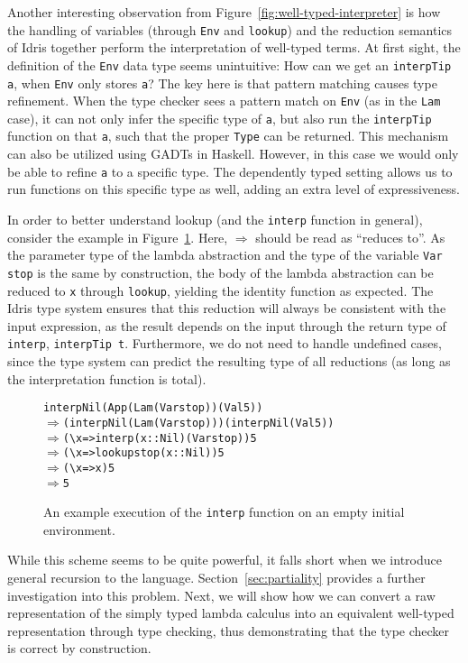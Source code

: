 Another interesting observation from Figure~\ref{fig:well-typed-interpreter} is how the handling of variables (through \texttt{Env} and \texttt{lookup}) and the reduction semantics of Idris together perform the interpretation of well-typed terms. At first sight, the definition of the \texttt{Env} data type seems unintuitive: How can we get an \texttt{interpTip a}, when \texttt{Env} only stores \texttt{a}? The key here is that pattern matching causes type refinement. When the type checker sees a pattern match on \texttt{Env} (as in the \texttt{Lam} case), it can not only infer the specific type of \texttt{a}, but also run the \texttt{interpTip} function on that \texttt{a}, such that the proper \texttt{Type} can be returned. This mechanism can also be utilized using GADTs in Haskell. However, in this case we would only be able to refine \texttt{a} to a specific type. The dependently typed setting allows us to run functions on this specific type as well, adding an extra level of expressiveness.

In order to better understand lookup (and the \texttt{interp} function in general), consider the example in Figure~\ref{fig:well-typed-interpreter-example}. Here, $\Rightarrow$ should be read as ``reduces to''. As the parameter type of the lambda abstraction and the type of the variable \texttt{Var stop} is the same by construction, the body of the lambda abstraction can be reduced to \texttt{x} through \texttt{lookup}, yielding the identity function as expected. The Idris type system ensures that this reduction will always be consistent with the input expression, as the result depends on the input through the return type of \texttt{interp}, \texttt{interpTip t}. Furthermore, we do not need to handle undefined cases, since the type system can predict the resulting type of all reductions (as long as the interpretation function is total).

\begin{figure}
\begin{alltt}
interp Nil (App (Lam (Var stop)) (Val 5))
\(\Rightarrow\) (interp Nil (Lam (Var stop))) (interp Nil (Val 5))
\(\Rightarrow\) (\textbackslash{x} => interp (x :: Nil) (Var stop)) 5
\(\Rightarrow\) (\textbackslash{x} => lookup stop (x :: Nil)) 5
\(\Rightarrow\) (\textbackslash{x} => x) 5
\(\Rightarrow\) 5
\end{alltt}
\caption{An example execution of the \texttt{interp} function on an empty initial environment.}
\label{fig:well-typed-interpreter-example}
\end{figure}

While this scheme seems to be quite powerful, it falls short when we introduce general recursion to the language. Section~\ref{sec:partiality} provides a further investigation into this problem. Next, we will show how we can convert a raw representation of the simply typed lambda calculus into an equivalent well-typed representation through type checking, thus demonstrating that the type checker is correct by construction.
